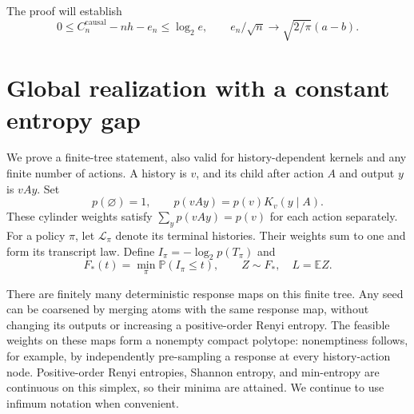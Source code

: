 \documentclass[11pt,a4paper]{article}
\newcommand{\E}{\mathbb E}
\newcommand{\Prob}{\mathbb P}
\newcommand{\causal}{\mathrm{causal}}
\begin{document}
The proof will establish
\begin{equation}\label{eq:twoingredients}
0\le C_n^{\causal}-nh-e_n\le\log_2e,
\qquad e_n/\sqrt n\longrightarrow\sqrt{2/\pi}(a-b).
\end{equation}

\section{Global realization with a constant entropy gap}
We prove a finite-tree statement, also valid for history-dependent
kernels and any finite number of actions. A history is $v$, and its
child after action $A$ and output $y$ is $vAy$. Set
\[
p(\varnothing)=1,\qquad p(vAy)=p(v)K_v(y\mid A).
\]
These cylinder weights satisfy
$\sum_y p(vAy)=p(v)$ for each action separately. For a policy $\pi$,
let $\mathcal L_\pi$ denote its terminal histories. Their weights sum
to one and form its transcript law. Define $I_\pi=-\log_2p(T_\pi)$ and
\[
F_*(t)=\min_\pi\Prob(I_\pi\le t),\qquad Z\sim F_*,\quad L=\E Z.
\]

There are finitely many deterministic response maps on this finite tree.
Any seed can be coarsened by merging atoms with the same response map,
without changing its outputs or increasing a positive-order Renyi entropy.
The feasible weights on these maps form a nonempty compact polytope:
nonemptiness follows, for example, by independently pre-sampling a response
at every history-action node. Positive-order Renyi entropies, Shannon
entropy, and min-entropy are continuous on this simplex, so their minima
are attained. We continue to use infimum notation when convenient.
\end{document}
